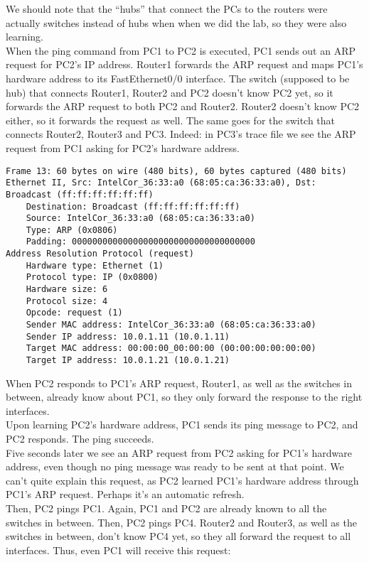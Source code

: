We should note that the ``hubs'' that connect the PCs to the routers were actually switches
instead of hubs when when we did the lab, so they were also learning. \\
When the ping command from PC1 to PC2 is executed, PC1 sends out an ARP request for PC2's IP
address. Router1 forwards the ARP request and maps PC1's hardware address to its FastEthernet0/0
interface. The switch (supposed to be hub) that connects Router1, Router2 and PC2 doesn't know
PC2 yet, so it forwards the ARP request to both PC2 and Router2. Router2 doesn't know PC2
either, so it forwards the request as well. The same goes for the switch that connects Router2,
Router3 and PC3. Indeed: in PC3's trace file we see the ARP request from PC1 asking for PC2's
hardware address.
\begin{lstlisting}
Frame 13: 60 bytes on wire (480 bits), 60 bytes captured (480 bits)
Ethernet II, Src: IntelCor_36:33:a0 (68:05:ca:36:33:a0), Dst: Broadcast (ff:ff:ff:ff:ff:ff)
    Destination: Broadcast (ff:ff:ff:ff:ff:ff)
    Source: IntelCor_36:33:a0 (68:05:ca:36:33:a0)
    Type: ARP (0x0806)
    Padding: 000000000000000000000000000000000000
Address Resolution Protocol (request)
    Hardware type: Ethernet (1)
    Protocol type: IP (0x0800)
    Hardware size: 6
    Protocol size: 4
    Opcode: request (1)
    Sender MAC address: IntelCor_36:33:a0 (68:05:ca:36:33:a0)
    Sender IP address: 10.0.1.11 (10.0.1.11)
    Target MAC address: 00:00:00_00:00:00 (00:00:00:00:00:00)
    Target IP address: 10.0.1.21 (10.0.1.21)
\end{lstlisting}
When PC2 responds to PC1's ARP request, Router1, as well as the switches in between, already
know about PC1, so they only forward the response to the right interfaces. \\
Upon learning PC2's hardware address, PC1 sends its ping message to PC2, and PC2 responds.
The ping succeeds. \\
Five seconds later we see an ARP request from PC2 asking for PC1's hardware address, even though no
ping message was ready to be sent at that point. We can't quite explain this request, as PC2
learned PC1's hardware address through PC1's ARP request. Perhaps it's an automatic refresh. \\
Then, PC2 pings PC1. Again, PC1 and PC2 are already known to all the
switches in between. Then, PC2 pings PC4. Router2 and Router3, as well as the switches in between,
don't know PC4 yet, so they all forward the request to all interfaces. Thus, even PC1 will receive
this request:
